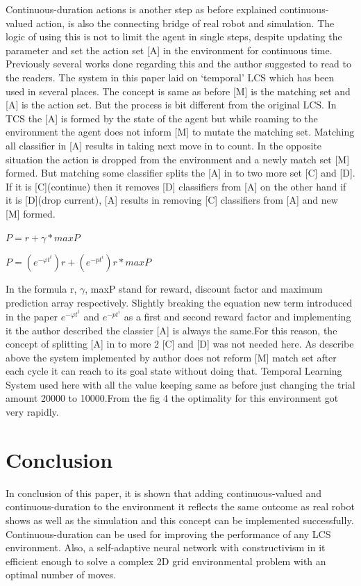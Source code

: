 \documentclass[12pt]{article}
\begin{document}
Continuous-duration actions is another step as before explained continuous-valued action, is also the connecting bridge of real robot and simulation. The logic of using this is not to limit the agent in single steps, despite updating the parameter and set the action set [A] in the environment for continuous time. Previously several works done regarding this and the author suggested to read \cite{349978} to the readers. The system in this paper laid on ‘temporal’ LCS which has been used in several places. The concept is same as before [M] is the matching set and [A] is the action set. But the process is bit different from the original LCS. In TCS the [A] is formed by the state of the agent but while roaming to the environment the agent does not inform [M] to mutate the matching set. Matching all classifier in [A] results in taking next move in to count. In the opposite situation the action is dropped from the environment and a newly match set [M] formed. But matching some classifier splits the [A] in to two more set [C] and [D]. If it is [C](continue) then it removes [D] classifiers from [A] on the other hand if it is [D](drop current), [A] results in removing [C] classifiers from [A] and new [M] formed. 

\begin{center} $ P  = r  + \gamma * maxP$
\end{center}
\begin{center} $ P  = (e ^ {-\varphi t^t})r  + (e ^ {- pt^i})r * maxP$
\end{center}
In the formula r, $\gamma$, maxP stand for reward, discount factor and maximum prediction array respectively. Slightly breaking the equation new term introduced in the paper $e ^ {-\varphi t^t}$ and $e ^ {- pt^i}$ as a first and second reward factor and implementing it the author described the classier [A] is always the same.For this reason, the concept of splitting [A] in to more 2 [C] and [D] was not needed here. As describe above the system implemented by author does not reform [M] match set after each cycle it can reach to its goal state without doing that. Temporal Learning System used here with all the value keeping same as before just changing the trial amount 20000 to 10000.From the fig 4 the optimality for this environment got very rapidly.
\section{Conclusion}
\label{sec:conc}
In conclusion of this paper, it is shown that adding continuous-valued and continuous-duration to the environment it reflects the same outcome as real robot shows as well as the simulation and this concept can be implemented successfully. Continuous-duration can be used for improving the performance of any LCS environment. Also, a self-adaptive neural network with constructivism in it efficient enough to solve a complex 2D grid environmental problem with an optimal number of moves.
\end{document}
